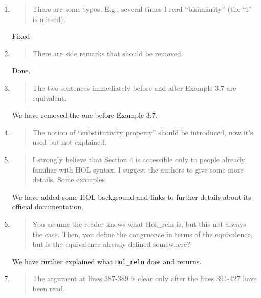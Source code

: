 \begin{enumerate}

\item \begin{quote}
    There are some typos. E.g., several times I read “bisimiarity” (the “l” is missed).
  \end{quote}

  Fixed %
  
\item \begin{quote}
    There are side remarks that should be removed.
  \end{quote}

Done.  %
  
\item \begin{quote}
    The two sentences immediately before and after Example 3.7 are equivalent.
  \end{quote}

  We have removed the one before Example 3.7.

\item \begin{quote}
    The notion of “substitutivity property” should be introduced, now it’s used but not explained.
  \end{quote}

\item \begin{quote}
    I strongly believe that Section 4 is accessible only to people
    already familiar with HOL syntax. I suggest the authors to give
    some more details. Some examples.
  \end{quote}

  We have added some HOL background and links to further details about its official documentation.
  
\item \begin{quote}
    You assume the reader knows what Hol_reln is, but this not always the case. 
Then, you define the congruence in terms of the equivalence, but is
the equivalence already defined somewhere?
  \end{quote}

  We have  further explained what  \texttt{Hol_reln} does and returns.
  
\item \begin{quote}
    The argument at lines 387-389 is clear only after the lines 394-427 have been read.
  \end{quote}


\end{enumerate}
